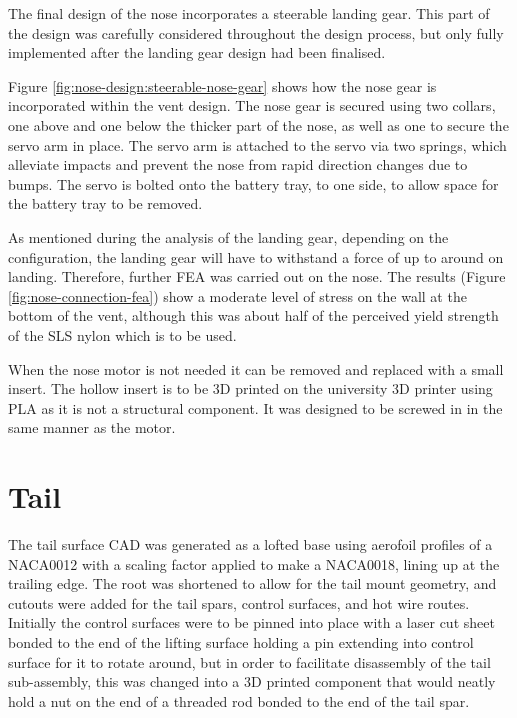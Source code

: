 \documentclass[../../main.tex]{subfiles}
\begin{document}
The final design of the nose incorporates a steerable landing gear.
This part of the design was carefully considered throughout the design process, but only fully implemented after the landing gear design had been finalised. 


Figure \ref{fig:nose-design:steerable-nose-gear} shows how the nose gear is incorporated within the vent design.
The nose gear is secured using two collars, one above and one below the thicker part of the nose, as well as one to secure the servo arm in place.
The servo arm is attached to the servo via two springs, which alleviate impacts and prevent the nose from rapid direction changes due to bumps.
The servo is bolted onto the battery tray, to one side, to allow space for the battery tray to be removed. 

As mentioned during the analysis of the landing gear, depending on the configuration, the landing gear will have to withstand a force of up to around  on landing.
Therefore, further FEA was carried out on the nose.
The results (Figure \ref{fig:nose-connection-fea}) show a moderate level of stress on the wall at the bottom of the vent, although this was about half of the perceived yield strength of the SLS nylon which is to be used. 


When the nose motor is not needed it can be removed and replaced with a small insert.
The hollow insert is to be 3D printed on the university 3D printer using PLA as it is not a structural component.
It was designed to be screwed in in the same manner as the motor. 


\section{Tail} \label{sec:final-design-proposal:tail}


The tail surface CAD was generated as a lofted base using aerofoil profiles of a NACA0012 with a scaling factor applied to make a NACA0018, lining up at the trailing edge.
The root was shortened to allow for the tail mount geometry, and cutouts were added for the tail spars, control surfaces, and hot wire routes.
Initially the control surfaces were to be pinned into place with a laser cut sheet bonded to the end of the lifting surface holding a pin extending into control surface for it to rotate around, but in order to facilitate disassembly of the tail sub-assembly, this was changed into a 3D printed component that would neatly hold a nut on the end of a threaded rod bonded to the end of the tail spar.
\end{document}

